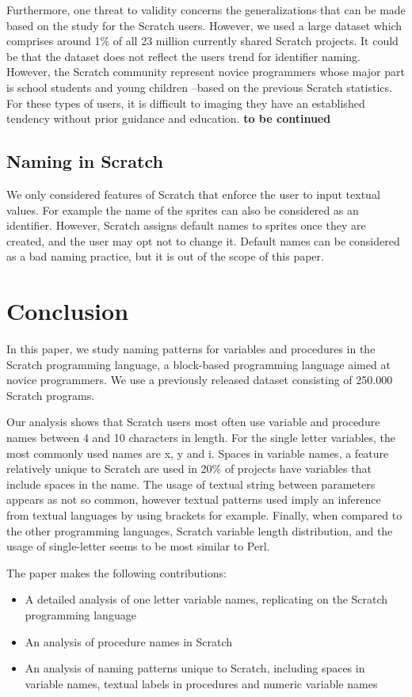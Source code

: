 \documentclass[conference]{IEEEtran}
\newcommand{\todo}[1]{ \textbf{#1} }
\begin{document}
Furthermore, one threat to validity concerns the generalizations that can be made based on the study for the Scratch users.  However, we used a large dataset which comprises around 1\% of all 23 million currently shared Scratch projects. It could be that the dataset does not reflect the users trend for identifier naming. However, the Scratch community represent novice programmers whose major part is school students and young children --based on the previous Scratch statistics. For these types of users, it is difficult to imaging they have an established tendency without prior guidance and education. 
\todo{to be continued}

\subsection{Naming in Scratch}
We only considered features of Scratch that enforce the user to input textual values. For example the name of the sprites can also be considered as an identifier. However, Scratch assigns default names to sprites once they are created, and the user may opt not to change it. Default names can be considered as a bad naming practice, but it is out of the scope of this paper.\\

\section{Conclusion}
In this paper, we study naming patterns for variables and procedures in the Scratch programming language, a block-based programming language aimed at novice programmers. We use a previously released dataset consisting of 250.000 Scratch programs. 

Our analysis shows that Scratch users most often use variable and procedure names between 4 and 10 characters in length. For the single letter variables, the most commonly used names are x, y and i. Spaces in variable names, a feature relatively unique to Scratch are used in 20\% of projects have variables that include spaces in the name. The usage of textual string between parameters appears as not so common, however textual patterns used imply an inference from textual languages by using brackets for example. Finally, when compared to the other programming languages, Scratch variable length distribution, and the usage of single-letter seems to be most similar to Perl.

The paper makes the following contributions:

\begin{itemize}
\item A detailed analysis of one letter variable names, replicating \cite{Beniamini} on the Scratch programming language
\item An analysis of procedure names in Scratch
\item An analysis of naming patterns unique to Scratch, including spaces in variable names, textual labels in procedures and numeric variable names
\end{itemize}
\end{document}
